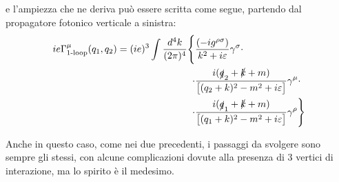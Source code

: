 \documentclass[../main.tex]{subfiles}
\begin{document}
\begin{itemize}
    e l'ampiezza che ne deriva può essere scritta come segue, partendo dal propagatore fotonico verticale a sinistra:
    \begin{equation}
        \begin{aligned}
           ie\Gamma^\mu_\text{1-loop}(q_1,q_2) = (ie)^3\int \frac{d^4k}{(2\pi)^4} \Bigg\{& \frac{(-ig^{\rho\sigma})}{k^2+i\varepsilon} \gamma^\sigma\cdot  \\
           \cdot&\frac{i(\slashed q_2 + \slashed k + m)}{\bigl[( q_2 +  k)^2 - m^2 + i\varepsilon\bigr]}\gamma^\mu\cdot \\ 
           \cdot&\frac{i(\slashed q_1 + \slashed k + m)}{\bigl[( q_1 + k)^2 - m^2 + i\varepsilon\bigr]}\gamma^\rho \Bigg\}
        \end{aligned}
        \label{eq:vertex_amplit_oneloop}
    \end{equation}

    Anche in questo caso, come nei due precedenti, i passaggi da svolgere sono sempre gli stessi, con alcune complicazioni dovute alla presenza di 3 vertici di interazione, ma lo spirito è il medesimo.


\end{itemize}
\end{document}
